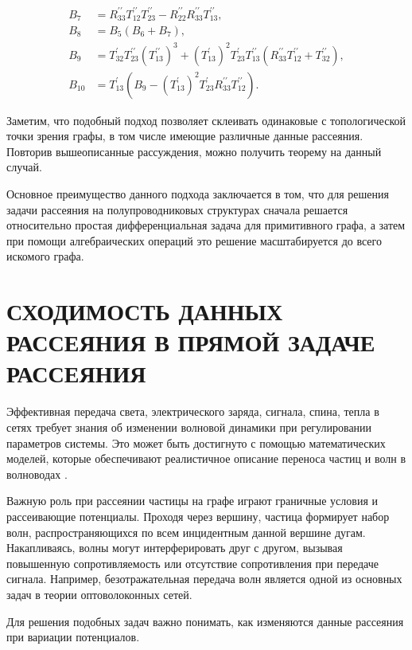 \documentclass[a4 paper, 12 pt]{extarticle}
\begin{document}
\[\begin{aligned}
   B_7 &= R_{33}^{\prime\prime} T_{12}^{\prime\prime} T_{23}^{\prime\prime} - R_{22}^{\prime\prime} R_{33}^{\prime\prime} T_{13}^{\prime\prime},\\
   B_8 &= B_5 \left(B_6 + B_7\right),\\
   B_9 &= T_{32}^\prime T_{23}^{\prime\prime} (T_{13}^{\prime\prime})^3 + (T_{13}^\prime)^2 T_{23}^\prime T_{13}^{\prime\prime} \left(R_{33}^{\prime\prime} T_{12}^{\prime\prime} + T_{32}^{\prime\prime}\right),\\
   B_{10} &= T_{13}^\prime\left(B_9 - (T_{13}^\prime)^2 T_{23}^\prime R_{33}^{\prime\prime} T_{12}^{\prime\prime}\right).
   \end{aligned}\]
   

   Заметим, что подобный подход позволяет склеивать одинаковые с топологической точки зрения графы, в том числе имеющие различные данные рассеяния. Повторив вышеописанные рассуждения, можно получить теорему на данный случай.
   
   Основное преимущество данного подхода заключается в том, что для решения задачи рассеяния на полупроводниковых структурах сначала решается относительно простая дифференциальная задача для примитивного графа, а затем при помощи алгебраических операций это решение масштабируется до всего искомого графа.
   
   \section{СХОДИМОСТЬ ДАННЫХ РАССЕЯНИЯ В ПРЯМОЙ ЗАДАЧЕ РАССЕЯНИЯ}
   
   Эффективная передача света, электрического заряда, сигнала, спина, тепла в сетях требует знания об изменении волновой динамики при регулировании параметров системы. Это может быть достигнуто с помощью математических моделей, которые обеспечивают реалистичное описание переноса частиц и волн в волноводах \cite{TransparentQuantumGraphs}.
   
   Важную роль при рассеянии частицы на графе играют граничные условия и рассеивающие потенциалы. Проходя через вершину, частица формирует набор волн, распространяющихся по всем инцидентным данной вершине дугам. Накапливаясь, волны могут интерферировать друг с другом, вызывая повышенную сопротивляемость или отсутствие сопротивления при передаче сигнала.
   Например, безотражательная передача волн является одной из основных задач в теории оптоволоконных сетей.
   
   Для решения подобных задач важно понимать, как изменяются данные рассеяния при вариации потенциалов.
   
\end{document}
